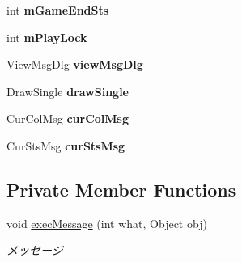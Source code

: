 \begin{DoxyCompactItemize}
\item 
\mbox{\label{class_reversi_form_1_1_reversi_play_a3410173bce66f3916b40c48396140993}} 
int {\bfseries m\+Game\+End\+Sts}
\item 
\mbox{\label{class_reversi_form_1_1_reversi_play_add7e0a08404e943de26b5ac89fd29e20}} 
int {\bfseries m\+Play\+Lock}
\item 
\mbox{\label{class_reversi_form_1_1_reversi_play_aa152286fa1fb56750474abb77d4838b5}} 
View\+Msg\+Dlg {\bfseries view\+Msg\+Dlg}
\item 
\mbox{\label{class_reversi_form_1_1_reversi_play_a7834c3b0182c46525b3c0b8fd6acd44f}} 
Draw\+Single {\bfseries draw\+Single}
\item 
\mbox{\label{class_reversi_form_1_1_reversi_play_a1bd07f75d970a73e504569ee1f1563d5}} 
Cur\+Col\+Msg {\bfseries cur\+Col\+Msg}
\item 
\mbox{\label{class_reversi_form_1_1_reversi_play_a42d6a55b31252e831d9eb859af5737c2}} 
Cur\+Sts\+Msg {\bfseries cur\+Sts\+Msg}
\end{DoxyCompactItemize}
\subsection*{Private Member Functions}
\begin{DoxyCompactItemize}
\item 
void \hyperlink{class_reversi_form_1_1_reversi_play_aa7cf1089065bff85997d057210312ae8}{exec\+Message} (int what, Object obj)
\begin{DoxyCompactList}\small\item\em メッセージ \end{DoxyCompactList}\end{DoxyCompactItemize}

